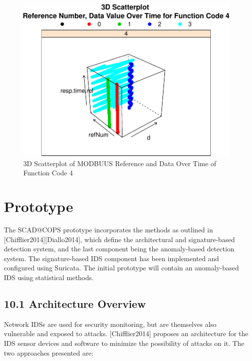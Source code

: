 \documentclass[12pt,]{article}
\begin{document}
\newpage

\begin{figure}

{\centering \includegraphics{thesis_files/figure-latex/unnamed-chunk-36-1} 

}

\caption{3D Scatterplot of MODBUUS Reference and Data Over Time of Function Code 4}\label{fig:unnamed-chunk-36}
\end{figure}

\pagebreak

\section{Prototype}\label{prototype}

The SCAD@COPS prototype incorporates the methods as outlined in
{[}Chifflier2014{]}{[}Diallo2014{]}, which define the architectural and
signature-based detection system, and the last component being the
anomaly-based detection system. The signature-based IDS component has
been implemented and configured using Suricata. The initial prototype
will contain an anomaly-based IDS using statistical methods.

\subsection{10.1 Architecture Overview}\label{architecture-overview}

Network IDSs are used for security monitoring, but are themselves also
vulnerable and exposed to attacks. {[}Chifflier2014{]} proposes an
architecture for the IDS sensor devices and software to minimize the
possibility of attacks on it. The two approaches presented are:
\end{document}
